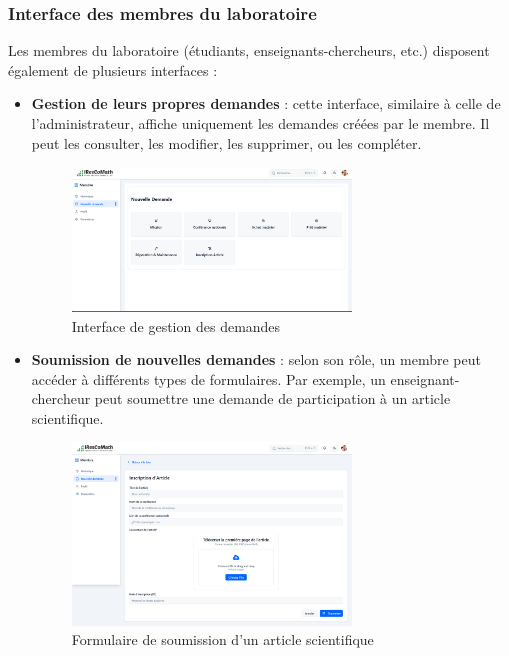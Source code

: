 \subsubsection{Interface des membres du laboratoire}

Les membres du laboratoire (étudiants, enseignants-chercheurs, etc.) disposent également de plusieurs interfaces :

\begin{itemize}
    \item \textbf{Gestion de leurs propres demandes} : cette interface, similaire à celle de l’administrateur, affiche uniquement les demandes créées par le membre. Il peut les consulter, les modifier, les supprimer, ou les compléter.
    \begin{figure}[H]
        \centering
        \includegraphics[width=0.7\textwidth]{images/interface/nouvelle_demande.png}
        \caption{Interface de gestion des demandes}
        \label{fig:gestion_demandes_membre}
    \end{figure}

    \item \textbf{Soumission de nouvelles demandes} : selon son rôle, un membre peut accéder à différents types de formulaires. Par exemple, un enseignant-chercheur peut soumettre une demande de participation à un article scientifique.
    \begin{figure}[H]
        \centering
        \includegraphics[width=0.7\textwidth]{images/interface/inscriptionArticle.png}
        \caption{Formulaire de soumission d’un article scientifique}
        \label{fig:articleScientifique}
    \end{figure}
\end{itemize}
